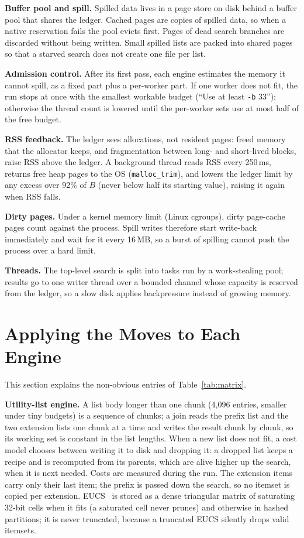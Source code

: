 \documentclass[conference]{IEEEtran}
\begin{document}
\textbf{Buffer pool and spill.} Spilled data lives in a page store on disk behind a buffer pool that
shares the ledger. Cached pages are copies of spilled data, so when a native reservation fails the
pool evicts first. Pages of dead search branches are discarded without being written. Small spilled
lists are packed into shared pages so that a starved search does not create one file per list.

\textbf{Admission control.} After its first pass, each engine estimates the memory it cannot spill,
as a fixed part plus a per-worker part. If one worker does not fit, the run stops at once with the
smallest workable budget (``Use at least \texttt{-b} 33''); otherwise the thread count is lowered
until the per-worker sets use at most half of the free budget.

\textbf{RSS feedback.} The ledger sees allocations, not resident pages: freed memory that the
allocator keeps, and fragmentation between long- and short-lived blocks, raise RSS above the ledger.
A background thread reads RSS every 250\,ms, returns free heap pages to the OS
(\texttt{malloc\_trim}), and lowers the ledger limit by any excess over 92\% of $B$ (never below
half its starting value), raising it again when RSS falls.

\textbf{Dirty pages.} Under a kernel memory limit (Linux cgroups), dirty page-cache pages count
against the process. Spill writes therefore start write-back immediately and wait for it every
16\,MB, so a burst of spilling cannot push the process over a hard limit.

\textbf{Threads.} The top-level search is split into tasks run by a work-stealing pool; results go
to one writer thread over a bounded channel whose capacity is reserved from the ledger, so a slow
disk applies backpressure instead of growing memory.

\section{Applying the Moves to Each Engine}\label{sec:model}

This section explains the non-obvious entries of Table~\ref{tab:matrix}.

\textbf{Utility-list engine.} A list body longer than one chunk (4,096 entries, smaller under tiny
budgets) is a sequence of chunks; a join reads the prefix list and the two extension lists one
chunk at a time and writes the result chunk by chunk, so its working set is constant in the list
lengths. When a new list does not fit, a cost model chooses between writing it to disk and
dropping it: a dropped list keeps a recipe and is recomputed from its parents, which are alive
higher up the search, when it is next needed. Costs are measured during the run. The extension
items carry only their last item; the prefix is passed down the search, so no itemset is copied
per extension. EUCS~\cite{fhm2014} is stored as a dense triangular matrix of saturating 32-bit
cells when it fits (a saturated cell never prunes) and otherwise in hashed partitions; it is never
truncated, because a truncated EUCS silently drops valid itemsets.
\end{document}
